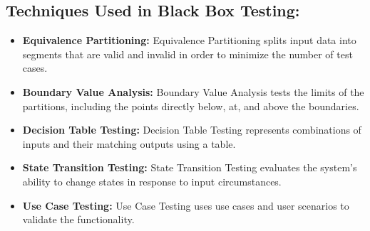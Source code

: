 \subsection{Techniques Used in Black Box Testing:}
\begin{itemize}
	\item \textbf{Equivalence Partitioning:} Equivalence Partitioning splits input data into segments that are valid and invalid in order to minimize the number of test cases.
	\item \textbf{Boundary Value Analysis:} Boundary Value Analysis tests the limits of the partitions, including the points directly below, at, and above the boundaries.
	\item \textbf{Decision Table Testing:} Decision Table Testing represents combinations of inputs and their matching outputs using a table.
	\item \textbf{State Transition Testing:} State Transition Testing evaluates the system's ability to change states in response to input circumstances.
	\item \textbf{Use Case Testing:} Use Case Testing uses use cases and user scenarios to validate the functionality.
\end{itemize}
